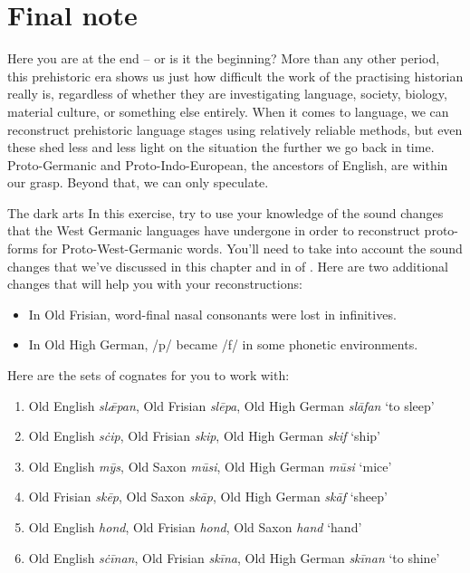 \section{Final note}

Here you are at the end -- or is it the beginning? More than any other period, this prehistoric era shows us just how difficult the work of the practising historian really is, regardless of whether they are investigating language, society, biology, material culture, or something else entirely. When it comes to language, we can reconstruct prehistoric language stages using relatively reliable methods, but even these shed less and less light on the situation the further we go back in time. Proto-Germanic and Proto-Indo-European, the ancestors of English, are within our grasp. Beyond that, we can only speculate.




\begin{exercises}{The dark arts}\label{exercise-reconstruction}
In this exercise, try to use your knowledge of the sound changes that the West Germanic languages have undergone in order to reconstruct proto-forms for Proto-West-Germanic words. You'll need to take into account the sound changes that we've discussed in this chapter and in  of . Here are two additional changes that will help you with your reconstructions:
\begin{itemize}
    \item In Old Frisian, word-final nasal consonants were lost in infinitives.
    \item In Old High German, /p/ became /f/ in some phonetic environments.
\end{itemize}

\noindent Here are the sets of cognates for you to work with:

\begin{enumerate}
    \item Old English \emph{slǣpan}, Old Frisian \emph{slēpa}, Old High German \emph{slāfan} `to sleep'
    \item Old English \emph{sċip}, Old Frisian \emph{skip}, Old High German \emph{skif} `ship'
    \item Old English \emph{mȳs}, Old Saxon \emph{mūsi}, Old High German \emph{mūsi} `mice'
    \item Old Frisian \emph{skēp}, Old Saxon \emph{skāp}, Old High German \emph{skāf} `sheep'
    \item Old English \emph{hond}, Old Frisian \emph{hond}, Old Saxon \emph{hand} `hand'
    \item Old English \emph{sċīnan}, Old Frisian \emph{skīna}, Old High German \emph{skīnan} `to shine'
\end{enumerate}

\end{exercises}

